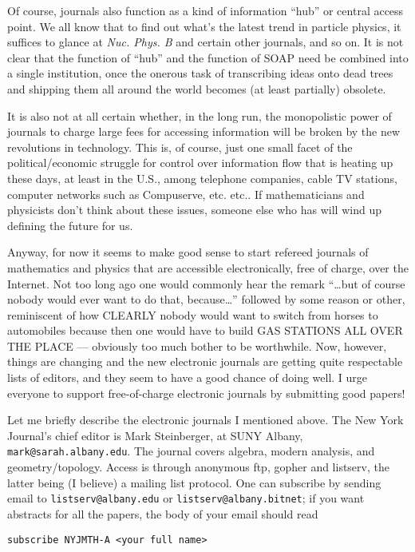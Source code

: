 \documentclass{article}
\begin{document}
Of course, journals also function as a kind of information ``hub'' or
central access point. We all know that to find out what's the latest
trend in particle physics, it suffices to glance at \emph{Nuc. Phys. B}
and certain other journals, and so on. It is not clear that the function
of ``hub'' and the function of SOAP need be combined into a single
institution, once the onerous task of transcribing ideas onto dead trees
and shipping them all around the world becomes (at least partially)
obsolete.

It is also not at all certain whether, in the long run, the monopolistic
power of journals to charge large fees for accessing information will be
broken by the new revolutions in technology. This is, of course, just
one small facet of the political/economic struggle for control over
information flow that is heating up these days, at least in the U.S.,
among telephone companies, cable TV stations, computer networks such as
Compuserve, etc. etc.. If mathematicians and physicists don't think
about these issues, someone else who has will wind up defining the
future for us.

Anyway, for now it seems to make good sense to start refereed journals
of mathematics and physics that are accessible electronically, free of
charge, over the Internet. Not too long ago one would commonly hear the
remark ``\ldots but of course nobody would ever want to do that,
because\ldots{}'' followed by some reason or other, reminiscent of how
CLEARLY nobody would want to switch from horses to automobiles because
then one would have to build GAS STATIONS ALL OVER THE PLACE ---
obviously too much bother to be worthwhile. Now, however, things are
changing and the new electronic journals are getting quite respectable
lists of editors, and they seem to have a good chance of doing well. I
urge everyone to support free-of-charge electronic journals by
submitting good papers!

Let me briefly describe the electronic journals I mentioned above. The
New York Journal's chief editor is Mark Steinberger, at SUNY Albany,
\texttt{mark@sarah.albany.edu}. The journal covers algebra, modern
analysis, and geometry/topology. Access is through anonymous ftp, gopher
and listserv, the latter being (I believe) a mailing list protocol. One
can subscribe by sending email to \texttt{listserv@albany.edu} or
\texttt{listserv@albany.bitnet}; if you want abstracts for all the
papers, the body of your email should read

\begin{verbatim}
subscribe NYJMTH-A <your full name>
\end{verbatim}
\end{document}
